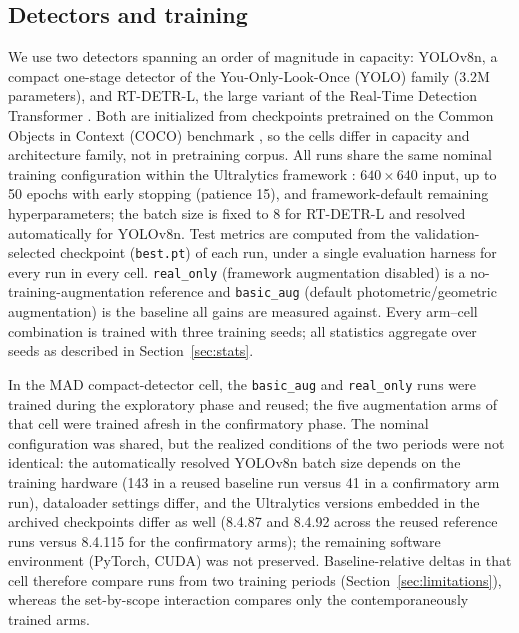 \documentclass[preprint,12pt,authoryear]{elsarticle}
\begin{document}
\subsection{Detectors and training}
We use two detectors spanning an order of magnitude in capacity:
YOLOv8n, a compact one-stage detector of the You-Only-Look-Once (YOLO)
family (3.2M parameters), and RT-DETR-L, the large variant of the
Real-Time Detection Transformer \citep[32M parameters;][]{zhao2024rtdetr}.
Both are initialized from checkpoints pretrained on the Common Objects
in Context (COCO) benchmark \citep{lin2014coco}, so the cells differ in capacity and
architecture family, not in pretraining corpus. All runs share the same nominal
training configuration within the Ultralytics framework
\citep{jocher2023ultralytics}: $640\times640$ input, up to 50 epochs
with early stopping (patience 15), and framework-default remaining
hyperparameters; the batch size is fixed to 8 for RT-DETR-L and
resolved automatically for YOLOv8n. Test metrics are computed from the
validation-selected checkpoint (\texttt{best.pt}) of each run, under a
single evaluation harness for every run in every cell.
\texttt{real\_only} (framework augmentation disabled) is a
no-training-augmentation reference and \texttt{basic\_aug} (default
photometric/geometric augmentation) is the baseline all gains are
measured against. Every arm--cell combination is trained with three
training seeds; all statistics aggregate over seeds as described in
Section~\ref{sec:stats}.

In the MAD compact-detector cell, the \texttt{basic\_aug} and
\texttt{real\_only} runs were trained during the exploratory phase and
reused; the five augmentation arms of that cell were trained afresh in
the confirmatory phase. The nominal configuration was shared, but the
realized conditions of the two periods were not identical: the
automatically resolved YOLOv8n batch size depends on the training
hardware (143 in a reused baseline run versus 41 in a confirmatory arm
run), dataloader settings differ, and the Ultralytics versions embedded in
the archived checkpoints differ as well (8.4.87 and 8.4.92 across the
reused reference runs versus 8.4.115 for the confirmatory arms); the
remaining software environment (PyTorch, CUDA) was not preserved.
Baseline-relative deltas in that cell therefore compare runs from two
training periods (Section~\ref{sec:limitations}), whereas the
set-by-scope interaction compares only the contemporaneously trained
arms.
\end{document}
